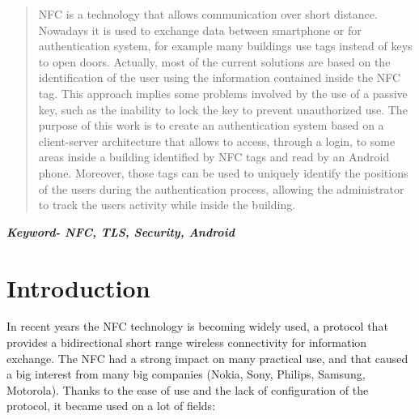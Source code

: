 \documentclass[conference]{IEEEtran}
\begin{document}
\maketitle


\begin{abstract}
NFC is a technology that allows communication over short distance. Nowadays it is used to exchange data between smartphone or for authentication system, for example many buildings use tags instead of keys to open doors.
Actually, most of the current solutions are based on the identification of the user using the information contained inside the NFC tag.
This approach implies some problems involved by the use of a passive key, such as the inability to lock the key to prevent unauthorized use.
The purpose of this work is to create an authentication system based on a client-server architecture that allows to access, through a login, to some areas inside a building identified by NFC tags and read by an Android phone.
Moreover, those tags can be used to uniquely identify the positions of the users during the authentication process, allowing the administrator to track the users activity while inside the building.\\


\end{abstract}



\textbf{\textit{Keyword- NFC, TLS, Security, Android}}





%
\IEEEpeerreviewmaketitle



\section{Introduction}
In recent years the NFC technology is becoming widely used, a protocol that provides a bidirectional short range wireless connectivity for information exchange.
The NFC had a strong impact on many practical use, and that caused a big interest from many big companies (Nokia, Sony, Philips, Samsung, Motorola).
Thanks to the ease of use and the lack of configuration of the protocol, it became used on a lot of fields:
\end{document}
